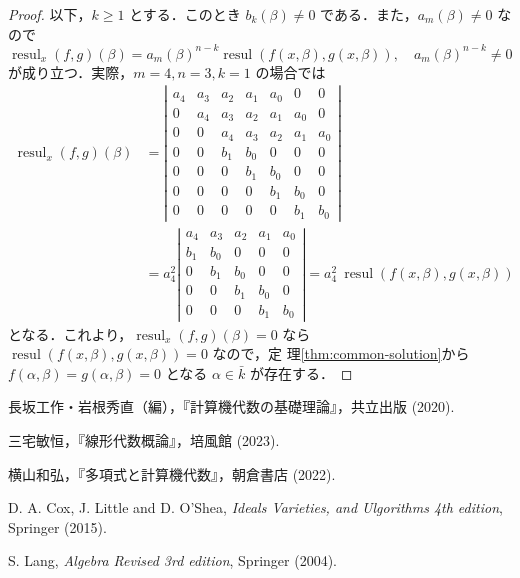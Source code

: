 \documentclass[12pt, uplatex, dvipdfmx]{jsarticle}
\theoremstyle{definition}
\DeclareMathOperator{\resul}{resul}
\begin{document}
\begin{proof}
  以下，$k\geq 1$ とする．このとき $b_k(\beta) \neq 0$ である．また，$a_m(\beta) \neq 0$ なので
  \[
    \resul_x(f,g)(\beta) = a_m(\beta)^{n-k} \resul(f(x,\beta), g(x,\beta)), \quad a_m(\beta)^{n-k} \neq 0
  \]
  が成り立つ．実際，$m=4, n=3, k=1$ の場合では
  \[
    \begin{aligned}
      \resul_x(f,g)(\beta) &= \left|
        \begin{array}{ccccccc}
          a_4 & a_3 & a_2 & a_1 & a_0 & 0 & 0\\
          0 & a_4 & a_3 & a_2 & a_1 & a_0 & 0\\
          0 & 0 & a_4 & a_3 & a_2 & a_1 & a_0\\
          0 & 0 & b_1 & b_0 & 0 & 0 & 0\\
          0 & 0 & 0 & b_1 & b_0 & 0 & 0\\
          0 & 0 & 0 & 0 & b_1 & b_0 & 0\\
          0 & 0 & 0 & 0 & 0 & b_1 & b_0
        \end{array}
      \right|\\
      & = a_4^2 \left|
        \begin{array}{ccccc}
          a_4 & a_3& a_2 & a_1 & a_0\\
          b_1 & b_0 & 0 & 0 & 0\\
          0 & b_1 & b_0 & 0 & 0\\
          0 & 0 & b_1 & b_0 & 0\\
          0 & 0 & 0 & b_1 & b_0
        \end{array}
      \right| = a_4^2 ~\resul(f(x,\beta),g(x,\beta))
    \end{aligned}
  \]
  となる．これより，$\resul_x(f,g)(\beta)=0$ なら
  $\resul(f(x,\beta), g(x,\beta))=0$ なので，定
  理\ref{thm:common-solution}から $f(\alpha,\beta)=g(\alpha,\beta)=0$
  となる $\alpha \in \bar{k}$ が存在する．
\end{proof}



\begin{thebibliography}{99}
 長坂工作・岩根秀直（編），『計算機代数の基礎理論』，共立出版 (2020).

 三宅敏恒，『線形代数概論』，培風館 (2023).

 横山和弘，『多項式と計算機代数』，朝倉書店 (2022).

 D. A. Cox, J. Little and D. O'Shea, \textit{Ideals Varieties, and Ulgorithms 4th edition}, Springer (2015).

 S. Lang, \textit{Algebra Revised 3rd edition}, Springer (2004). 
\end{thebibliography}
\end{document}
